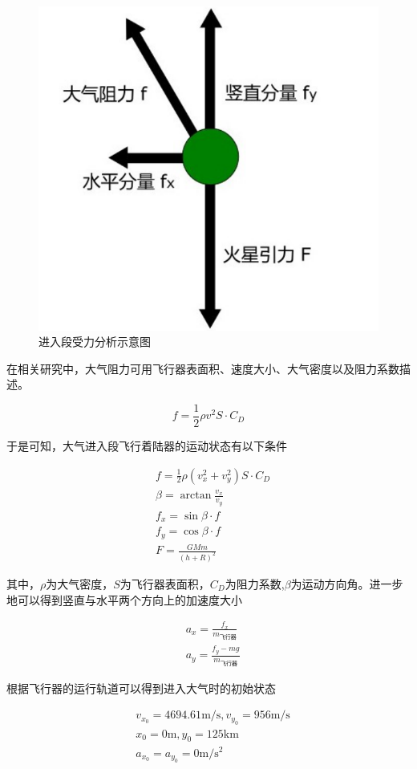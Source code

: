 \documentclass[UTF8,12pt]{ctexart}
\begin{document}
\begin{figure}[htb]
	\centering
	\includegraphics[width=0.5\linewidth]{受力分析.png}
	\caption{进入段受力分析示意图}
	\label{fig:pathdemo}	
\end{figure}

在相关研究中，大气阻力可用飞行器表面积、速度大小、大气密度以及阻力系数描述。

\begin{equation}
f=\frac12\rho v^2S\cdot C_D
\end{equation}

于是可知，大气进入段飞行着陆器的运动状态有以下条件

\begin{equation}
\begin{aligned}
	&f=\frac12\rho(v_x^2+v_y^2)S\cdot C_D\\
	&\beta=\arctan\frac{v_x}{v_y}\\
	&f_x=\sin\beta\cdot f\\
	&f_y=\cos\beta\cdot f\\
	&F=\frac{GMm}{(h+R)^2}
\end{aligned}
\end{equation}

其中，$\rho$为大气密度，$S$为飞行器表面积，$C_D$为阻力系数,$\beta$为运动方向角。进一步地可以得到竖直与水平两个方向上的加速度大小

\begin{equation}
\begin{aligned}
	&a_x=\frac{f_x}{m_{飞行器}}\\
	&a_y=\frac{f_y-mg}{m_{飞行器}}
\end{aligned}
\end{equation}

根据飞行器的运行轨道可以得到进入大气时的初始状态

\begin{equation}
\begin{aligned}
	&v_{x_0}=4694.61\mathrm{{m}/{s}},v_{y_0}=956\mathrm{{m}/{s}}\\
	&x_0=0\mathrm{m},y_0=125\mathrm{km}\\
	&a_{x_0}=a_{y_0}=0\mathrm{m/s^2}
\end{aligned}
\end{equation}
\end{document}
